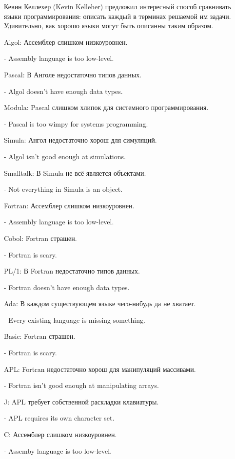 \documentclass[ebook,12pt,oneside,openany]{memoir}
\begin{document}
\maketitle

Кевин Келлехер (Kevin Kelleher) предложил интересный способ сравнивать
языки программирования: описать каждый в терминах решаемой им задачи.
Удивительно, как хорошо языки могут быть описанны таким образом.

Algol: Ассемблер слишком низкоуровнен.

- Assembly language is too low-level.

Pascal: В Анголе недостаточно типов данных.

- Algol doesn't have enough data types.

Modula: Pascal слишком хлипок для системного программирования.

- Pascal is too wimpy for systems programming.

Simula: Ангол недостаточно хорош для симуляций.

- Algol isn't good enough at simulations.

Smalltalk: В Simula не всё является объектами.

- Not everything in Simula is an object.

Fortran: Ассемблер слишком низкоуровнен.

- Assembly language is too low-level.

Cobol: Fortran страшен.

- Fortran is scary.

PL/1: В Fortran недостаточно типов данных.

- Fortran doesn't have enough data types.

Ada: В каждом существующем языке чего-нибудь да не хватает.

- Every existing language is missing something.

Basic: Fortran страшен.

- Fortran is scary.

APL: Fortran недостаточно хорош для манипуляций массивами.

- Fortran isn't good enough at manipulating arrays.

J: APL требует собственной раскладки клавиатуры.

- APL requires its own character set.

C: Ассемблер слишком низкоуровнен.

- Assemby language is too low-level.
\end{document}
